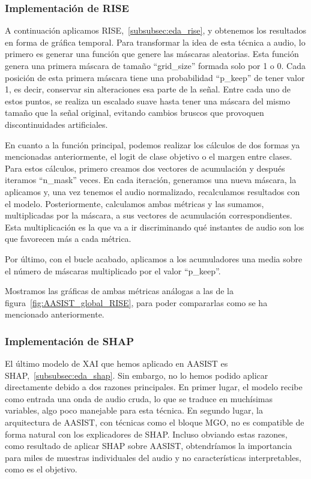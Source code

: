 \subsubsection*{Implementación de RISE}

A continuación aplicamos RISE,~\autoref{subsubsec:eda_rise}, y obtenemos los resultados en forma de gráfica temporal.
Para transformar la idea de esta técnica a audio, lo primero es generar una función que genere las máscaras aleatorias. Esta función genera una primera máscara de tamaño ``grid\_size'' formada solo por 1 o 0. Cada posición de esta primera máscara tiene una probabilidad ``p\_keep'' de tener valor 1, es decir, conservar sin alteraciones esa parte de la señal. Entre cada uno de estos puntos, se realiza un escalado suave hasta tener una máscara del mismo tamaño que la señal original, evitando cambios bruscos que provoquen discontinuidades artificiales.

En cuanto a la función principal, podemos realizar los cálculos de dos formas ya mencionadas anteriormente, el logit de clase objetivo o el margen entre clases. Para estos cálculos, primero creamos dos vectores de acumulación y después iteramos ``n\_mask'' veces.
En cada iteración, generamos una nueva máscara, la aplicamos y, una vez tenemos el audio normalizado, recalculamos resultados con el modelo. Posteriormente, calculamos ambas métricas y las sumamos, multiplicadas por la máscara, a sus vectores de acumulación correspondientes.
Esta multiplicación es la que va a ir discriminando qué instantes de audio son los que favorecen más a cada métrica.

Por último, con el bucle acabado, aplicamos a los acumuladores una media sobre el número de máscaras multiplicado por el valor ``p\_keep''.

Mostramos las gráficas de ambas métricas análogas a las de la figura~\autoref{fig:AASIST_global_RISE}, para poder compararlas como se ha mencionado anteriormente.

\subsubsection*{Implementación de SHAP}

El último modelo de XAI que hemos aplicado en AASIST es SHAP,~\autoref{subsubsec:eda_shap}. Sin embargo, no lo hemos podido aplicar directamente debido a dos razones principales. En primer lugar, el modelo recibe como entrada una onda de audio cruda, lo que se traduce en muchísimas variables, algo poco manejable para esta técnica. En segundo lugar, la arquitectura de AASIST, con técnicas como el bloque MGO, no es compatible de forma natural con los explicadores de SHAP. Incluso obviando estas razones, como resultado de aplicar SHAP sobre AASIST, obtendríamos la importancia para miles de muestras individuales del audio y no características interpretables, como es el objetivo.

